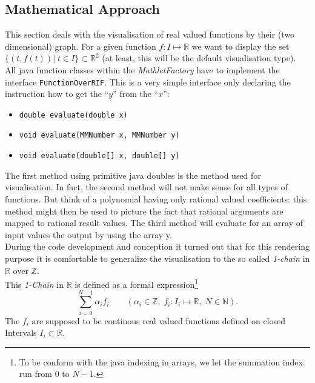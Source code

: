 \documentclass[a4paper,12pt]{book}
\newcommand{\appfac}{\emph{MathletFactory }}
\newcommand{\R}{\mathbb{R}}
\newcommand{\Rtext}{$\mathbb{R}$ }
\newcommand{\Ztext}{$\mathbb{Z}$}
\begin{document}
\begin{appendix}
\section{Mathematical Approach}
This section deals with the visualisation of real valued functions by their
(two dimensional) graph. For a given function $f:I\mapsto \R$ we want to display the set
$\{(t,f(t)) | \; t\in I\}\subset \R^2$ (at least, this will be the default visualisation type).\\
All java function classes within the \appfac have to implement the interface
{\texttt{FunctionOverRIF}}. This is a very simple interface only declaring the instruction how to get
  the ``$y$'' from the ``$x$'':
\begin{itemize}
\item {\texttt{double evaluate(double x)}}
\item {\texttt{void evaluate(MMNumber x, MMNumber y)}}
\item {\texttt{void evaluate(double[] x, double[] y)}}
\end{itemize}
The first method using primitive java doubles is the method used for visualisation. In fact, the second method will not make sense for all types of
functions. But think of a polynomial having only rational valued coefficients: this method
might then
be used to picture the fact that rational arguments are mapped to rational result values.
The third method will evaluate for an array of input values the output by using the array y.\\
During the code development and conception it turned out that for this rendering purpose it is comfortable to
generalize the visualisation to
the so called \emph{1-chain} in \Rtext over \Ztext.\\
 This
\emph{1-Chain} in \Rtext is defined as a formal expression\footnote{To be conform with the java indexing
  in arrays, we let the summation index run from $0$ to $N-1$.}
\[
\sum_{i=0}^{N-1} \alpha_i f_i\quad\quad (\alpha_i\in \mathbb{Z}, \; f_i:I_i\mapsto \R, \; N\in\mathbb{N}).
\]
The $f_i$ are supposed to be continous real valued functions defined on closed Intervals $I_i\subset \R$.\\


\end{appendix}
\end{document}
